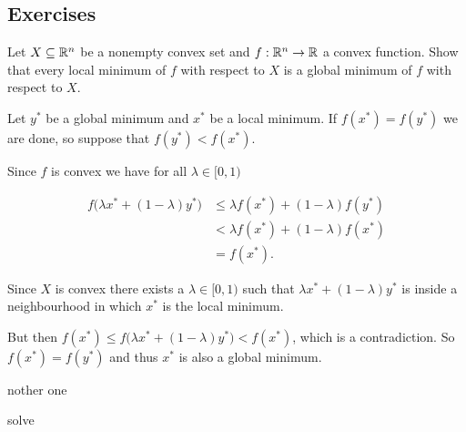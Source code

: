 \subsection{Exercises}

\begin{problem}

Let \(X \subseteq \mathbb{R}^n\) be a nonempty convex set and \(f : \mathbb{R}^n \to \mathbb{R}\) a convex function. Show that every local minimum of \(f\) with respect to \(X\) is a global minimum of \(f\) with respect to \(X\).

\end{problem}

\begin{solution}

Let \(y^*\) be a global minimum and \(x^*\) be a local minimum. If \(f(x^*) = f(y^*)\) we are done, so suppose that \(f(y^*) < f(x^*)\).

Since \(f\) is convex we have for all \(\lambda \in [0, 1)\)

\begin{align*}
    f \big( \lambda x^* + (1-\lambda) y^* \big) &\le \lambda f(x^*) + (1-\lambda) f(y^*) \\
    &< \lambda f(x^*) + (1-\lambda) f(x^*) \\
    &= f(x^*).
\end{align*}

Since \(X\) is convex there exists a \(\lambda \in [0,1)\) such that \(\lambda x^* + (1-\lambda) y^*\) is inside a neighbourhood in which \(x^*\) is the local minimum.

But then \(f(x^*) \le f \big( \lambda x^* + (1-\lambda) y^* \big) < f(x^*)\), which is a contradiction. So \(f(x^*) = f(y^*)\) and thus \(x^*\) is also a global minimum.

\end{solution}

\begin{problem}

nother one

\end{problem}

\begin{solution}
    solve
\end{solution}
    
